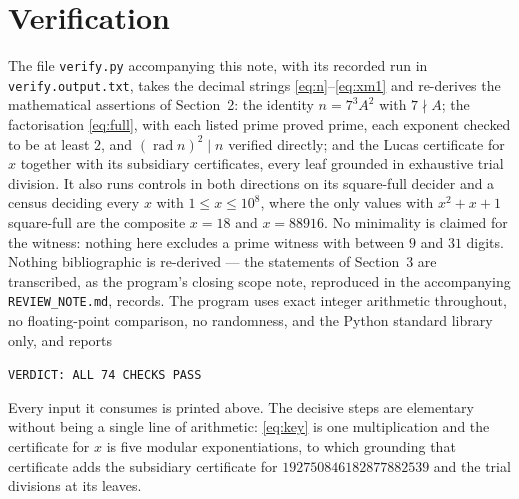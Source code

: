 \documentclass[11pt]{amsart}
\theoremstyle{remark}
\DeclareMathOperator{\rad}{rad}
\begin{document}
\section{Verification}

The file \texttt{verify.py} accompanying this note, with its recorded run in
\texttt{verify.output.txt}, takes the decimal strings
\eqref{eq:n}--\eqref{eq:xm1} and re-derives the mathematical assertions of
Section~2: the identity $n=7^3A^2$ with $7\nmid A$; the factorisation
\eqref{eq:full}, with each listed prime proved prime, each exponent checked to
be at least $2$, and $(\rad n)^2\mid n$ verified directly; and the Lucas
certificate for $x$ together with its subsidiary certificates, every leaf
grounded in exhaustive trial division. It also runs controls in both directions
on its square-full decider and a census deciding every $x$ with $1\le x\le10^8$,
where the only values with $x^2+x+1$ square-full are the composite $x=18$ and
$x=88916$. No minimality is claimed for the witness: nothing here excludes a
prime witness with between $9$ and $31$ digits. Nothing bibliographic is
re-derived --- the statements of Section~3 are transcribed, as the program's
closing scope note, reproduced in the accompanying \texttt{REVIEW\_NOTE.md},
records. The program uses exact integer arithmetic throughout, no floating-point
comparison, no randomness, and the Python standard library only, and reports
\begin{center}
\texttt{VERDICT: ALL 74 CHECKS PASS}
\end{center}
Every input it consumes is printed above. The decisive steps are elementary
without being a single line of arithmetic: \eqref{eq:key} is one multiplication
and the certificate for $x$ is five modular exponentiations, to which grounding
that certificate adds the subsidiary certificate for $192750846182877882539$
and the trial divisions at its leaves.
\end{document}
